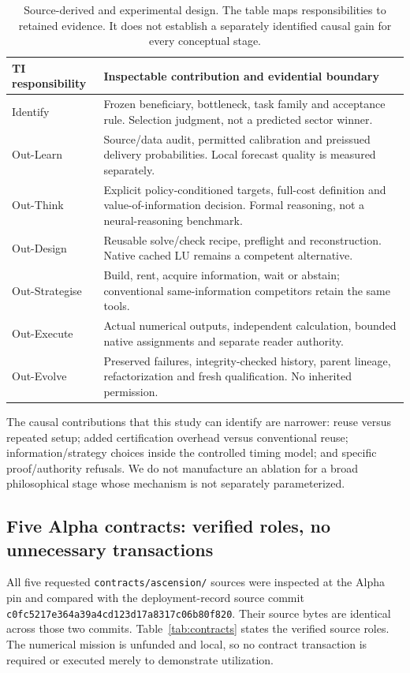 \documentclass[11pt,a4paper]{article}
\newcommand{\source}{\textsf{Source-derived}}
\begin{document}
\begin{table}[ht]\centering\small
\begin{tabularx}{\linewidth}{@{}L{28mm}Y@{}}\toprule
TI responsibility & Inspectable contribution and evidential boundary \\\midrule
Identify & Frozen beneficiary, bottleneck, task family and acceptance rule. Selection judgment, not a predicted sector winner. \\
Out-Learn & Source/data audit, permitted calibration and preissued delivery probabilities. Local forecast quality is measured separately. \\
Out-Think & Explicit policy-conditioned targets, full-cost definition and value-of-information decision. Formal reasoning, not a neural-reasoning benchmark. \\
Out-Design & Reusable solve/check recipe, preflight and reconstruction. Native cached LU remains a competent alternative. \\
Out-Strategise & Build, rent, acquire information, wait or abstain; conventional same-information competitors retain the same tools. \\
Out-Execute & Actual numerical outputs, independent calculation, bounded native assignments and separate reader authority. \\
Out-Evolve & Preserved failures, integrity-checked history, parent lineage, refactorization and fresh qualification. No inherited permission. \\\bottomrule
\end{tabularx}
\caption{\source{} and experimental design. The table maps responsibilities to retained evidence. It does not establish a separately identified causal gain for every conceptual stage.}
\label{tab:stages}\end{table}

The causal contributions that this study can identify are narrower: reuse versus repeated setup; added certification overhead versus conventional reuse; information/strategy choices inside the controlled timing model; and specific proof/authority refusals. We do not manufacture an ablation for a broad philosophical stage whose mechanism is not separately parameterized.

\subsection{Five Alpha contracts: verified roles, no unnecessary transactions}
All five requested \texttt{contracts/ascension/} sources were inspected at the Alpha pin and compared with the deployment-record source commit \texttt{c0fc5217e364a39a4cd123d17a8317c06b80f820}. Their source bytes are identical across those two commits. Table~\ref{tab:contracts} states the verified source roles. The numerical mission is unfunded and local, so no contract transaction is required or executed merely to demonstrate utilization.
\end{document}
